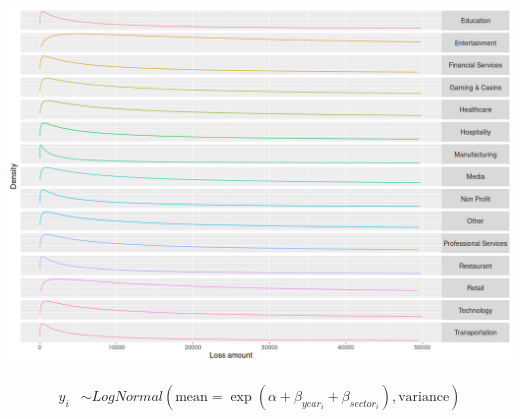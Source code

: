 \documentclass[usenames,dvipsnames]{beamer}
\begin{document}
\begin{frame}
\begin{center}
   \includegraphics[width=1.2\textheight]{./plots/distplot}
\end{center}
\begin{align*}
  y_i &\sim LogNormal( \text{mean} = \exp{( \alpha + \beta_{year_i} +  \beta_{sector_i})} , \text{variance} )
\end{align*}
\end{frame}
\end{document}

